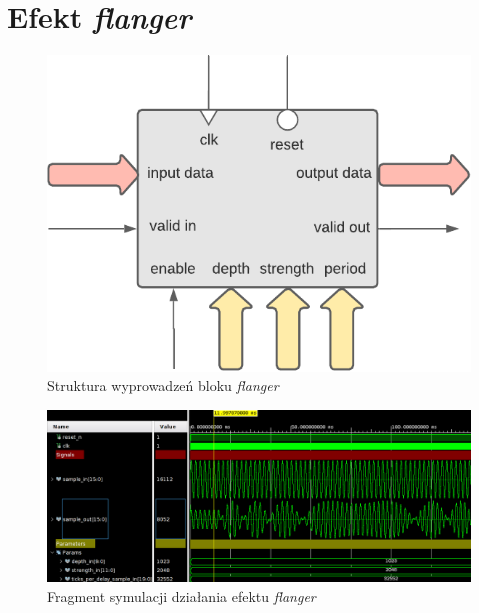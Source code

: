 \section{Efekt \textit{flanger}}



\vspace{0.5cm}
\begin{figure}[ht]
    \centering
    \includegraphics[scale=0.75]{img/diagrams/flanger.pdf}
    \captionsetup{format=plain,justification=centering}
    \caption{Struktura wyprowadzeń bloku \textit{flanger}}
    \label{flanger-structure}
\end{figure}
\vspace{0.5cm}

\vspace{0.5cm}
\begin{figure}[ht]
    \centering
    \includegraphics[width=\textwidth]{img/sim/flanger_sim.png}
    \captionsetup{format=plain,justification=centering}
    \caption{Fragment symulacji działania efektu \textit{flanger}}
    \label{sim-flanger}
\end{figure}
\vspace{0.5cm}